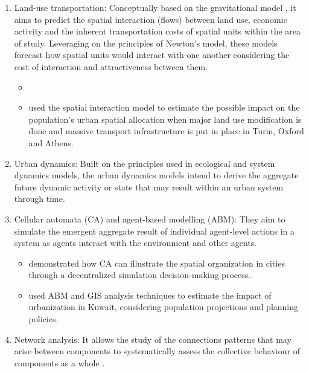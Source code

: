 \documentclass[12pt, a4paper]{report}
\begin{document}
\begin{enumerate}
  \item Land-use transportation: Conceptually based on the gravitational model \citep{wilsonFamilySpatialInteraction1971a}, it aims to predict the spatial interaction (flows) between land use, economic activity and the inherent transportation costs of spatial units within the area of study. Leveraging on the principles of Newton's model, these models forecast how spatial units would interact with one another considering the cost of interaction and attractiveness between them. 
  \begin{itemize}
        
      \item 
      \item \cite{lopaneLanduseTransportinteractionFramework2023} used the spatial interaction model to estimate the possible impact on the population's urban spatial allocation when major land use modification is done and massive transport infrastructure is put in place in Turin, Oxford and Athens.

      
  \end{itemize}
  \item Urban dynamics: Built on the principles used in ecological and system dynamics models, the urban dynamics models intend to derive the aggregate future dynamic activity or state that may result within an urban system through time.
  \item Cellular automata (CA) and agent-based modelling (ABM): They aim to simulate the emergent aggregate result of individual agent-level actions in a system as agents interact with the environment and other agents.
  \begin{itemize}
      \item   \cite{battyCellularAutomataUrban1997} demonstrated how CA can illustrate the spatial organization in cities through a decentralized simulation decision-making process.
      \item \cite{alghaisModellingFutureImpacts2018} used ABM and GIS analysis techniques to estimate the impact of urbanization in Kuwait, considering population projections and planning policies.
  \end{itemize}
  \item Network analysis: It allows the study of the connections patterns that may arise between components to systematically assess the collective behaviour of components as a whole \citep{newmanNetworksIntroduction2010}.
\end{enumerate}
\end{document}
